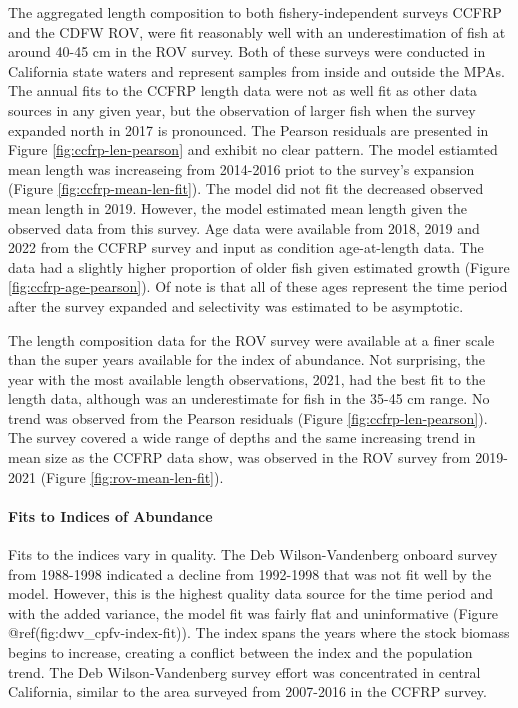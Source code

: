 \documentclass[11pt,
  english,
  letterpaper,
]{article}
\begin{document}
The aggregated length composition to both fishery-independent surveys CCFRP and the CDFW ROV, were fit reasonably well with an underestimation of fish at around 40-45 cm in the ROV survey. Both of these surveys were conducted in California state waters and represent samples from inside and outside the MPAs. The annual fits to the CCFRP length data were not as well fit as other data sources in any given year, but the observation of larger fish when the survey expanded north in 2017 is pronounced. The Pearson residuals are presented in Figure \ref{fig:ccfrp-len-pearson} and exhibit no clear pattern. The model estiamted mean length was increaseing from 2014-2016 priot to the survey's expansion (Figure \ref{fig:ccfrp-mean-len-fit}). The model did not fit the decreased observed mean length in 2019. However, the model estimated mean length given the observed data from this survey. Age data were available from 2018, 2019 and 2022 from the CCFRP survey and input as condition age-at-length data. The data had a slightly higher proportion of older fish given estimated growth (Figure \ref{fig:ccfrp-age-pearson}). Of note is that all of these ages represent the time period after the survey expanded and selectivity was estimated to be asymptotic.

The length composition data for the ROV survey were available at a finer scale than the super years available for the index of abundance. Not surprising, the year with the most available length observations, 2021, had the best fit to the length data, although was an underestimate for fish in the 35-45 cm range. No trend was observed from the Pearson residuals (Figure \ref{fig:ccfrp-len-pearson}). The survey covered a wide range of depths and the same increasing trend in mean size as the CCFRP data show, was observed in the ROV survey from 2019-2021 (Figure \ref{fig:rov-mean-len-fit}).

\hypertarget{fits-to-indices-of-abundance}{%
\paragraph{Fits to Indices of Abundance}\label{fits-to-indices-of-abundance}}

Fits to the indices vary in quality. The Deb Wilson-Vandenberg onboard survey from 1988-1998 indicated a decline from 1992-1998 that was not fit well by the model. However, this is the highest quality data source for the time period and with the added variance, the model fit was fairly flat and uninformative (Figure @ref(fig:dwv\_cpfv-index-fit)). The index spans the years where the stock biomass begins to increase, creating a conflict between the index and the population trend. The Deb Wilson-Vandenberg survey effort was concentrated in central California, similar to the area surveyed from 2007-2016 in the CCFRP survey.
\end{document}
